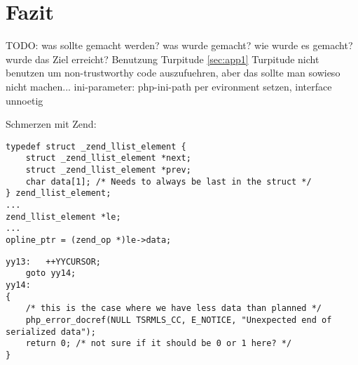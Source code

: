 
\section{Fazit}
\label{sec:chap1:fazit}

TODO:
was sollte gemacht werden? was wurde gemacht? wie wurde es gemacht?
wurde das Ziel erreicht?
Benutzung Turpitude \ref{sec:app1}
Turpitude nicht benutzen um non-trustworthy code auszufuehren, aber das sollte man
sowieso nicht machen...
ini-parameter: php-ini-path per evironment setzen, interface unnoetig

Schmerzen mit Zend:
\begin{lstlisting}[caption=lustiges Beispiel f"ur Zend-Code]
typedef struct _zend_llist_element {
    struct _zend_llist_element *next;
    struct _zend_llist_element *prev;
    char data[1]; /* Needs to always be last in the struct */
} zend_llist_element;
...
zend_llist_element *le;
...
opline_ptr = (zend_op *)le->data;
\end{lstlisting}

\begin{lstlisting}[caption=lustiges Beispiel f"ur Zend-Code]
yy13:   ++YYCURSOR;
    goto yy14;
yy14:
{
    /* this is the case where we have less data than planned */
    php_error_docref(NULL TSRMLS_CC, E_NOTICE, "Unexpected end of serialized data");
    return 0; /* not sure if it should be 0 or 1 here? */
}
 
\end{lstlisting}

